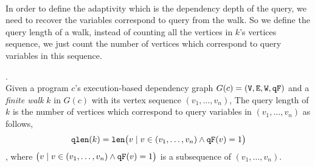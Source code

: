 %
\\
In order to define the adaptivity which is the dependency depth of the query, we need to recover the 
variables correspond to query from the walk. So we define the query length of a walk, 
instead of counting all 
the vertices in $k$'s vertices sequence, we just count the number of vertices which correspond to query variables in this sequence.
%
\begin{defn}.
\label{def:qlen}
\\
Given 
a program $c$'s execution-based dependency graph $G(c) = (\mathtt{V}, \mathtt{E}, \mathtt{W}, \mathtt{qF})$
 and a \emph{finite walk} $k$ in $G(c)$ with its vertex sequence $(v_1, \ldots, v_{n})$, 
The query length of $k$ is the number of vertices which correspond to query variables in $(v_1, \ldots, v_{n})$ as follows, 
\[
  \mathtt{qlen}(k) = \mathtt{len}\big( v \mid v \in (v_1, \ldots, v_{n}) \land \mathtt{qF}(v) = 1 \big)
\]
, where $\big(v \mid v \in (v_1, \ldots, v_{n}) \land \mathtt{qF}(v) = 1 \big)$ is a subsequence of $(v_1, \ldots, v_{n})$.
\end{defn}
%
%
% 
